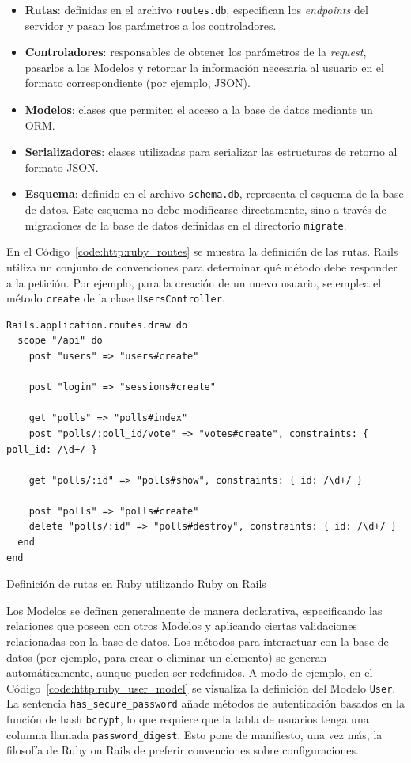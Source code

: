 \documentclass[11pt]{article}
\newcommand{\english}[1]{\textit{#1}}
\begin{document}
\begin{itemize}
    \item \textbf{Rutas}: definidas en el archivo \lstinline{routes.db}, especifican los \english{endpoints} del servidor y pasan los parámetros a los controladores.
    \item \textbf{Controladores}: responsables de obtener los parámetros de la \english{request}, pasarlos a los Modelos y retornar la información necesaria al usuario en el formato correspondiente (por ejemplo, JSON).
    \item \textbf{Modelos}: clases que permiten el acceso a la base de datos mediante un ORM.
    \item \textbf{Serializadores}: clases utilizadas para serializar las estructuras de retorno al formato JSON.
    \item \textbf{Esquema}: definido en el archivo \lstinline{schema.db}, representa el esquema de la base de datos. Este esquema no debe modificarse directamente, sino a través de migraciones de la base de datos definidas en el directorio \lstinline{migrate}.
\end{itemize}

En el Código~\ref{code:http:ruby_routes} se muestra la definición de las rutas. Rails utiliza un conjunto de convenciones para determinar qué método debe responder a la petición. Por ejemplo, para la creación de un nuevo usuario, se emplea el método \lstinline{create} de la clase \lstinline{UsersController}.

\begin{listing}
\begin{verbatim}
Rails.application.routes.draw do
  scope "/api" do
    post "users" => "users#create"

    post "login" => "sessions#create"

    get "polls" => "polls#index"
    post "polls/:poll_id/vote" => "votes#create", constraints: { poll_id: /\d+/ }

    get "polls/:id" => "polls#show", constraints: { id: /\d+/ }

    post "polls" => "polls#create"
    delete "polls/:id" => "polls#destroy", constraints: { id: /\d+/ }
  end
end
\end{verbatim}
\caption{Definición de rutas en Ruby utilizando Ruby on Rails}
\label{code:http:ruby_routes}
\end{listing}

Los Modelos se definen generalmente de manera declarativa, especificando las relaciones que poseen con otros Modelos y aplicando ciertas validaciones relacionadas con la base de datos. Los métodos para interactuar con la base de datos (por ejemplo, para crear o eliminar un elemento) se generan automáticamente, aunque pueden ser redefinidos. A modo de ejemplo, en el Código~\ref{code:http:ruby_user_model} se visualiza la definición del Modelo \lstinline{User}. La sentencia \lstinline{has_secure_password} añade métodos de autenticación basados en la función de hash \lstinline{bcrypt}, lo que requiere que la tabla de usuarios tenga una columna llamada \lstinline{password_digest}. Esto pone de manifiesto, una vez más, la filosofía de Ruby on Rails de preferir convenciones sobre configuraciones.
\end{document}
